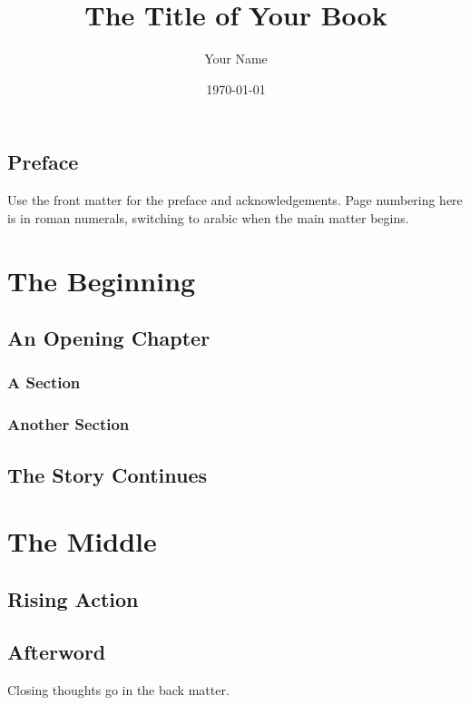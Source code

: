 \documentclass[11pt,a4paper]{book}
\title{The Title of Your Book}
\author{Your Name}
\date{\today}
\begin{document}
\frontmatter
\maketitle

\tableofcontents

\chapter*{Preface}
Use the front matter for the preface and acknowledgements. Page numbering here is
in roman numerals, switching to arabic when the main matter begins.

\mainmatter

\part{The Beginning}

\chapter{An Opening Chapter}
\section{A Section}
\lipsum[1-2]

\section{Another Section}
\lipsum[3]

\chapter{The Story Continues}
\lipsum[4-5]

\part{The Middle}

\chapter{Rising Action}
\lipsum[6-7]

\backmatter
\chapter{Afterword}
Closing thoughts go in the back matter.
\end{document}
